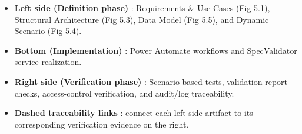 \FloatBarrier
\vspace{-4pt}
\begin{itemize}
    \item \textcolor[HTML]{003D99}{\textbf{Left side (Definition phase)}} : Requirements \& Use Cases (Fig 5.1), Structural Architecture (Fig 5.3), Data Model (Fig 5.5), and Dynamic Scenario (Fig 5.4).
    \item \textcolor[HTML]{003D99}{\textbf{Bottom (Implementation)}} : Power Automate workflows and SpecValidator service realization.
    \item \textcolor[HTML]{003D99}{\textbf{Right side (Verification phase)}} : Scenario-based tests, validation report checks, access-control verification, and audit/log traceability.
    \item \textcolor[HTML]{003D99}{\textbf{Dashed traceability links}} : connect each left-side artifact to its corresponding verification evidence on the right.
\end{itemize}



